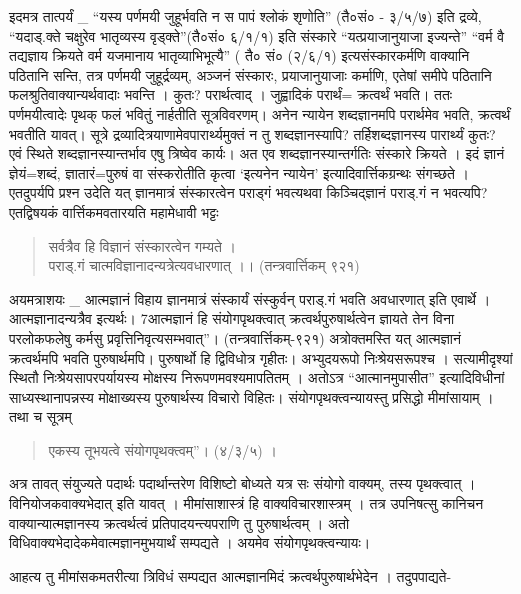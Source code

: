 इदमत्र तात्पर्यं \_ “यस्य पर्णमयी जुहूर्भवति न स पापं श्लोकं शृणोति” (तै०सं० - ३/५/७) इति द्रव्ये, “यदाड्.क्ते चक्षुरेव भातृव्यस्य वृड्क्ते”(तै०सं० ६/­१/१) इति संस्कारे “यत्प्रयाजानुयाजा इज्यन्ते” “वर्म वै तद्यज्ञाय क्रियते वर्म यजमानाय भातृव्याभिभूत्यै” ( तै० सं० (२/६/१) इत्यसंस्कारकर्मणि वाक्यानि पठितानि सन्ति, तत्र पर्णमयी जुहूर्द्रव्यम्, अञ्जनं संस्कारः, प्रयाजानुयाजाः कर्माणि, एतेषां समीपे पठितानि फलश्रुतिवाक्यान्यर्थवादाः भवन्ति । कुतः? परार्थत्वाद् । जुह्वादिकं परार्थं= क्रत्वर्थं भवति। ततः पर्णमयीत्वादेः पृथक् फलं भवितुं नार्हतीति सूत्रविवरणम्। अनेन न्यायेन शब्दज्ञानमपि परार्थमेव भवति, क्रत्वर्थं भवतीति यावत्। सूत्रे द्रव्यादित्रयाणामेवपारार्थ्यमुक्तं न तु शब्दज्ञानस्यापि? तर्हिशब्दज्ञानस्य पारार्थ्यं कुतः? एवं स्थिते शब्दज्ञानस्यान्तर्भाव एषु त्रिष्वेव कार्यः। अत एव शब्दज्ञानस्यान्तर्गतिः संस्कारे क्रियते । इदं ज्ञानं ज्ञेयं=शब्दं, ज्ञातारं=पुरुषं वा संस्करोतीति कृत्वा ‘इत्यनेन न्यायेन’ इत्यादिवार्त्तिकग्रन्थः संगच्छते । एतदुपर्यपि प्रश्न उदेति यत् ज्ञानमात्रं संस्कारत्वेन पराड्गं भवत्यथवा किञ्चिद्ज्ञानं पराड्.गं न भवत्यपि? एतद्विषयकं वार्त्तिकमवतारयति महामेधावी भट्टः
\begin{verse}
सर्वत्रैव हि विज्ञानं संस्कारत्वेन गम्यते ।\\
पराड्.गं चात्मविज्ञानादन्यत्रेत्यवधारणात् ।। (तन्त्रवार्त्तिकम् ९२१)
\end{verse}
अयमत्राशयः \_ आत्मज्ञानं विहाय ज्ञानमात्रं संस्कार्यं संस्कुर्वन् पराड्.गं भवति अवधारणात् इति एवार्थे । आत्मज्ञानादन्यत्रैव इत्यर्थः। 7आत्मज्ञानं हि संयोगपृथक्त्वात् क्रत्वर्थपुरुषार्थत्वेन ज्ञायते तेन विना परलोकफलेषु कर्मसु प्रवृत्तिनिवृत्यसम्भवात्”। (तन्त्रवार्त्तिकम्-९२१) अत्रोक्तमस्ति यत् आत्मज्ञानं क्रत्वर्थमपि भवति पुरुषार्थमपि। पुरुषार्थो हि द्विविधोत्र गृहीतः। अभ्युदयरूपो निःश्रेयसरूपश्च । सत्यामीदृश्यां स्थितौ निःश्रेयसापरपर्यायस्य मोक्षस्य निरूपणमवश्यमापतितम् । अतोऽत्र “आत्मानमुपासीत” इत्यादिविधीनां साध्यस्थानापन्नस्य मोक्षाख्यस्य पुरुषार्थस्य विचारो विहितः। संयोगपृथक्त्वन्यायस्तु प्रसिद्धो मीमांसायाम् । तथा च सूत्रम्
\begin{verse}
एकस्य तूभयत्वे संयोगपृथक्त्वम्”। (४/३/५) । 
\end{verse}
अत्र तावत् संयुज्यते पदार्थः पदार्थान्तरेण विशिष्टो बोध्यते यत्र सः संयोगो वाक्यम्, तस्य पृथक्त्वात् । विनियोजकवाक्यभेदात् इति यावत् । मीमांसाशास्त्रं हि वाक्यविचारशास्त्रम् । तत्र उपनिषत्सु कानिचन वाक्यान्यात्मज्ञानस्य क्रत्वर्थत्वं प्रतिपादयन्त्यपराणि तु पुरुषार्थत्वम् । अतो विधिवाक्यभेदादेकमेवात्मज्ञानमुभयार्थं सम्पद्यते । अयमेव संयोगपृथक्त्वन्यायः।

आहत्य तु मीमांसकमतरीत्या त्रिविधं सम्पद्यत आत्मज्ञानमिदं क्रत्वर्थपुरुषार्थभेदेन । तदुपपाद्यते-

